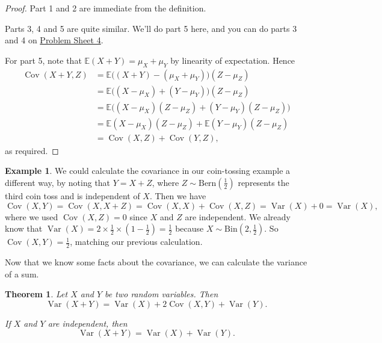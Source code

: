 \documentclass[
  a4paper,
]{book}
\newtheorem{theorem}{Theorem}[chapter]
\theoremstyle{definition}
\theoremstyle{definition}
\newtheorem{example}{Example}[chapter]
\theoremstyle{definition}
\theoremstyle{definition}
\theoremstyle{remark}
\begin{document}
\begin{proof}
Part 1 and 2 are immediate from the definition.

Parts 3, 4 and 5 are quite similar. We'll do part 5 here, and you can do parts 3 and 4 on \protect\hyperlink{P4}{Problem Sheet 4}.

For part 5, note that \(\mathbb E(X + Y) = \mu_X + \mu_Y\) by linearity of expectation. Hence
\begin{align*}
\operatorname{Cov}(X + Y, Z)
  &= \mathbb E \big((X + Y) - (\mu_X + \mu_Y)\big)(Z - \mu_Z) \\
  &= \mathbb E \big((X - \mu_X) + (Y - \mu_Y)\big)(Z - \mu_Z) \\
  &= \mathbb E \big((X - \mu_X)(Z - \mu_Z) + (Y - \mu_Y) (Z - \mu_Z) \big) \\
  &= \mathbb E (X - \mu_X)(Z - \mu_Z) + \mathbb E  (Y - \mu_Y) (Z - \mu_Z) \\
  &= \operatorname{Cov}(X,Z) + \operatorname{Cov}(Y,Z) ,
\end{align*}
as required.
\end{proof}

\begin{example}
We could calculate the covariance in our coin-tossing example a different way, by noting that \(Y = X + Z\), where \(Z \sim \text{Bern}(\frac12)\) represents the third coin toss and is independent of \(X\). Then we have
\[
\operatorname{Cov}(X,Y) = \operatorname{Cov}(X, X + Z) = \operatorname{Cov}(X, X) + \operatorname{Cov}(X, Z)
= \operatorname{Var}(X) + 0 = \operatorname{Var}(X) ,\]
where we used \(\operatorname{Cov}(X, Z) = 0\) since \(X\) and \(Z\) are independent.
We already know that \(\operatorname{Var}(X) = 2 \times \tfrac12 \times (1 - \tfrac12) = \tfrac12\) because \(X \sim \text{Bin}(2, \frac12)\). So \(\operatorname{Cov}(X,Y) = \frac12\),
matching our previous calculation.
\end{example}

Now that we know some facts about the covariance, we can calculate the variance of a sum.

\begin{theorem}
Let \(X\) and \(Y\) be two random variables. Then
\[ \operatorname{Var}(X + Y) = \operatorname{Var}(X) + 2\operatorname{Cov}(X,Y) + \operatorname{Var}(Y) . \]

If \(X\) and \(Y\) are independent, then
\[ \operatorname{Var}(X + Y) = \operatorname{Var}(X) + \operatorname{Var}(Y) . \]
\end{theorem}
\end{document}
